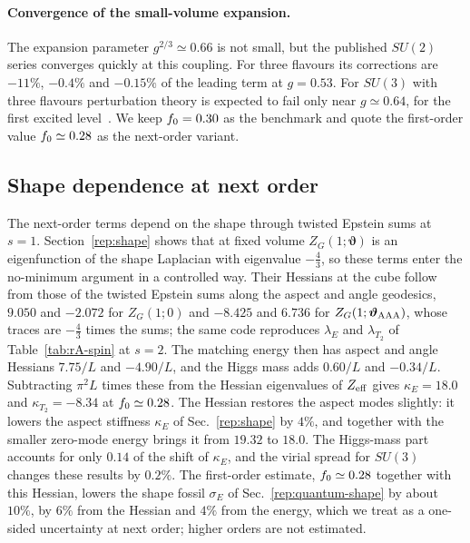 \paragraph{Convergence of the small-volume expansion.}
The expansion parameter $g^{2/3}\simeq0.66$ is not small, but the published $SU(2)$ series converges quickly at this coupling. %
For three flavours its corrections are $-11\%$, $-0.4\%$ and $-0.15\%$ of the leading term at $g=0.53$. %
For $SU(3)$ with three flavours perturbation theory is expected to fail only near $g\simeq0.64$, for the first excited level~\cite{vanBaal:1988va}. %
We keep $f_0=0.30$ as the benchmark and quote the first-order value $f_0\simeq0.28$ as the next-order variant. %

\subsection{Shape dependence at next order}
\label{rA:zm-shape}

The next-order terms depend on the shape through twisted Epstein sums at $s=1$.
Section~\ref{rep:shape} shows that at fixed volume $Z_G(1;\bm\vartheta)$ is an eigenfunction of the shape Laplacian with eigenvalue $-\tfrac43$, so these terms enter the no-minimum argument in a controlled way.
Their Hessians at the cube follow from those of the twisted Epstein sums along the aspect and angle geodesics, $9.050$ and $-2.072$ for $Z_G(1;0)$ and $-8.425$ and $6.736$ for $Z_G(1;\bm\vartheta_{\rm AAA})$, whose traces are $-\tfrac43$ times the sums; the same code reproduces $\lambda_E$ and $\lambda_{T_2}$ of Table~\ref{tab:rA-spin} at $s=2$. %
The matching energy then has aspect and angle Hessians $7.75/L$ and $-4.90/L$, and the Higgs mass adds $0.60/L$ and $-0.34/L$. %
Subtracting $\pi^2L$ times these from the Hessian eigenvalues of $Z_{\rm eff}$ gives $\kappa_E=18.0$ and $\kappa_{T_2}=-8.34$ at $f_0\simeq0.28$. %
The Hessian restores the aspect modes slightly: it lowers the aspect stiffness $\kappa_E$ of Sec.~\ref{rep:shape} by $4\%$, and together with the smaller zero-mode energy brings it from $19.32$ to $18.0$. %
The Higgs-mass part accounts for only $0.14$ of the shift of $\kappa_E$, and the virial spread for $SU(3)$ changes these results by $0.2\%$. %
The first-order estimate, $f_0\simeq0.28$ together with this Hessian, lowers the shape fossil $\sigma_E$ of Sec.~\ref{rep:quantum-shape} by about $10\%$, by $6\%$ from the Hessian and $4\%$ from the energy, which we treat as a one-sided uncertainty at next order; higher orders are not estimated. %

